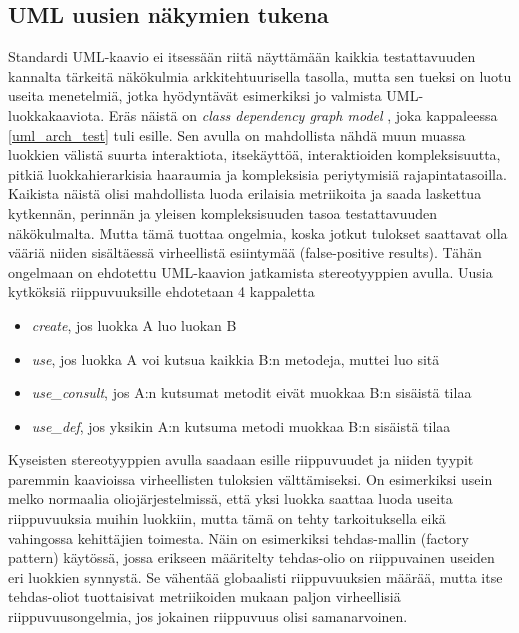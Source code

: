 \documentclass[finnish]{tktltiki2}
\numberwithin{table}{section}
\theoremstyle{definition}
\theoremstyle{remark}
\begin{document}
\subsection{UML uusien näkymien tukena}


Standardi UML-kaavio ei itsessään riitä näyttämään kaikkia testattavuuden kannalta tärkeitä näkökulmia arkkitehtuurisella tasolla, mutta sen tueksi on luotu useita menetelmiä, jotka hyödyntävät esimerkiksi jo valmista UML-luokkakaaviota. Eräs näistä on \textit{class dependency graph model} \citep{baudry_testability_2002}, joka kappaleessa \ref{uml_arch_test} tuli esille. Sen avulla on mahdollista nähdä muun muassa luokkien välistä suurta interaktiota, itsekäyttöä, interaktioiden kompleksisuutta, pitkiä luokkahierarkisia haaraumia ja kompleksisia periytymisiä rajapintatasoilla.
Kaikista näistä olisi mahdollista luoda erilaisia metriikoita ja saada laskettua kytkennän, perinnän ja yleisen kompleksisuuden tasoa testattavuuden näkökulmalta. Mutta tämä tuottaa ongelmia, koska jotkut tulokset saattavat olla vääriä niiden sisältäessä virheellistä esiintymää (false-positive results). Tähän ongelmaan on ehdotettu UML-kaavion jatkamista stereotyyppien avulla. Uusia kytköksiä riippuvuuksille ehdotetaan 4 kappaletta \citep[s. 4]{baudry_measuring_2003}

\begin{itemize}
	\item \textit{create}, jos luokka A luo luokan B
	\item \textit{use}, jos luokka A voi kutsua kaikkia B:n metodeja, muttei luo sitä
	\item \textit{use\_consult}, jos A:n kutsumat metodit eivät muokkaa B:n sisäistä tilaa
	\item \textit{use\_def}, jos yksikin A:n kutsuma metodi muokkaa B:n sisäistä tilaa
\end{itemize}

\noindent
Kyseisten stereotyyppien avulla saadaan esille riippuvuudet ja niiden tyypit paremmin kaavioissa virheellisten tuloksien välttämiseksi. On esimerkiksi usein melko normaalia oliojärjestelmissä, että yksi luokka saattaa luoda useita riippuvuuksia muihin luokkiin, mutta tämä on tehty tarkoituksella eikä vahingossa kehittäjien toimesta. Näin on esimerkiksi tehdas-mallin (factory pattern) käytössä, jossa erikseen määritelty tehdas-olio on riippuvainen useiden eri luokkien synnystä. Se vähentää globaalisti riippuvuuksien määrää, mutta itse tehdas-oliot tuottaisivat metriikoiden mukaan paljon virheellisiä riippuvuusongelmia, jos jokainen riippuvuus olisi samanarvoinen.
\end{document}
